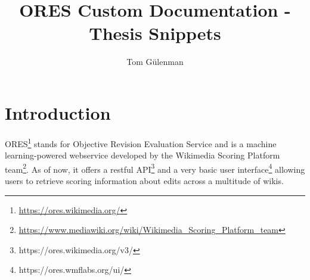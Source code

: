 \documentclass[12pt,a4paper]{article}
\title{ORES Custom Documentation - Thesis Snippets}
\author{Tom Gülenman}
\date{}
\begin{document}
\tableofcontents
\section{Introduction}
ORES\footnote{\url{https://ores.wikimedia.org/}} stands for Objective Revision Evaluation Service and is a machine learning-powered webservice developed by the Wikimedia Scoring Platform team\footnote{\url{https://www.mediawiki.org/wiki/Wikimedia_Scoring_Platform_team}}. As of now, it offers a restful API\footnote{https://ores.wikimedia.org/v3/} and a very basic user interface\footnote{https://ores.wmflabs.org/ui/} allowing users to retrieve scoring information about edits across a multitude of wikis.
\end{document}
